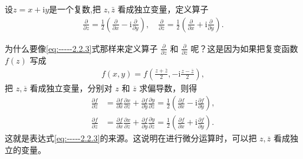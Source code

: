 \documentclass[../../main.tex]{subfiles}%
\begin{document}
\begin{definition}
设$z=x+\mathrm{i}y$是一个复数,把 \( z,\bar{z} \) 看成独立变量，定义算子
\begin{align}\label{eq:-----2.2.3}
\frac{\partial}{\partial z} = \frac{1}{2}\left( \frac{\partial}{\partial x} - \text{i}\frac{\partial}{\partial y} \right), \quad
\frac{\partial}{\partial \overline{z}} = \frac{1}{2}\left( \frac{\partial}{\partial x} + \text{i}\frac{\partial}{\partial y} \right).
\end{align}
\end{definition}
\begin{remark}
为什么要像\eqref{eq:-----2.2.3}式那样来定义算子 \( \frac{\partial}{\partial z} \) 和 \( \frac{\partial}{\partial \overline{z}} \) 呢？这是因为如果把复变函数 \( f(z) \) 写成
\begin{align*}
f(x,y) = f\left( \frac{z + \overline{z}}{2}, -\text{i}\frac{z - \overline{z}}{2} \right),
\end{align*}
把 \( z,\overline{z} \) 看成独立变量，分别对 \( z \) 和 \( \overline{z} \) 求偏导数，则得
\begin{align*}
\frac{\partial f}{\partial z} &= \frac{\partial f}{\partial x}\frac{\partial x}{\partial z} + \frac{\partial f}{\partial y}\frac{\partial y}{\partial z} = \frac{1}{2}\left( \frac{\partial f}{\partial x} - \text{i}\frac{\partial f}{\partial y} \right), \\
\frac{\partial f}{\partial \overline{z}} &= \frac{\partial f}{\partial x}\frac{\partial x}{\partial \overline{z}} + \frac{\partial f}{\partial y}\frac{\partial y}{\partial \overline{z}} = \frac{1}{2}\left( \frac{\partial f}{\partial x} + \text{i}\frac{\partial f}{\partial y} \right).
\end{align*}
这就是表达式\eqref{eq:-----2.2.3}的来源。这说明在进行微分运算时，可以把 \( z,\overline{z} \) 看成独立的变量。
\end{remark}
\end{document}

